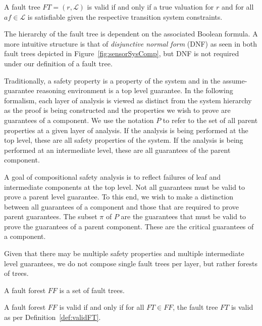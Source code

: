 \begin{definition} 
A fault tree $FT = (r, \mathcal{L})$ is valid if and only if a true valuation for $r$ and for all $\mathit{af} \in \mathcal{L}$ is satisfiable given the respective transition system constraints. 
\label{def:validFT}
\end{definition}

The hierarchy of the fault tree is dependent on the associated Boolean formula. A more intuitive structure is that of {\em disjunctive normal form} (DNF) as seen in both fault trees depicted in Figure~\ref{fig:sensorSysComp}, but DNF is not required under our definition of a fault tree. 

Traditionally, a safety property is a property of the system and in the assume-guarantee reasoning environment is a top level guarantee. In the following formalism, each layer of analysis is viewed as distinct from the system hierarchy as the proof is being constructed and the properties we wish to prove are guarantees of a component. We use the notation $P$ to refer to the set of all parent properties at a given layer of analysis. If the analysis is being performed at the top level, these are all safety properties of the system. If the analysis is being performed at an intermediate level, these are all guarantees of the parent component.

A goal of compositional safety analysis is to reflect failures of leaf and intermediate components at the top level. Not all guarantees must be valid to prove a parent level guarantee. To this end, we wish to make a distinction between all guarantees of a component and those that are required to prove parent guarantees. The subset $\pi$ of $P$ are the guarantees that must be valid to prove the guarantees of a parent component. These are the critical guarantees of a component.

Given that there may be multiple safety properties and multiple intermediate level guarantees, we do not compose single fault trees per layer, but rather forests of trees.

\begin{definition}
A fault forest $\mathit{FF}$ is a set of fault trees.
\end{definition}

\begin{definition}
A fault forest $\mathit{FF}$ is valid if and only if for all $ \mathit{FT} \in \mathit{FF}$, the fault tree $\mathit{FT}$ is valid as per Definition~\ref{def:validFT}.
\label{def:validFF}
\end{definition}



